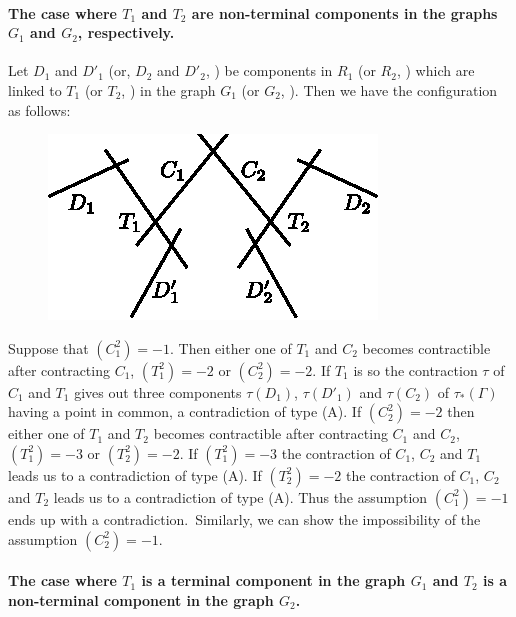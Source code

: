 \paragraph{The case where $T_{1}$ and $T_{2}$ are non-terminal
  components in the graphs $G_{1}$ and $G_{2}$, respectively.}\label{chap2:6.17.2.1}


Let $D_{1}$ and $D'_{1}$ (or, $D_{2}$ and $D'_{2}$, \resp) be
components in $R_{1}$ (or $R_{2}$, \resp) which are linked to $T_{1}$
(or $T_{2}$, \resp) in the graph $G_{1}$ (or $G_{2}$, \resp). Then we
have the configuration as follows:
\begin{figure}[H]
\centering
\includegraphics[scale=1.2]{figures/chap2-fig36.eps}
\end{figure}

Suppose that $(C^{2}_{1})=-1$. Then either one of $T_{1}$ and $C_{2}$
becomes contractible after contracting $C_{1}$, \iec $(T^{2}_{1})=-2$
or $(C^{2}_{2})=-2$. If $T_{1}$ is so the contraction $\tau$ of
$C_{1}$ and $T_{1}$ gives out three components $\tau(D_{1})$,
$\tau(D'_{1})$ and $\tau(C_{2})$ of $\tau_{\ast}(\Gamma)$ having a
point in common, a contradiction of type (A). If $(C^{2}_{2})=-2$ then
either one of $T_{1}$ and $T_{2}$ becomes contractible after
contracting $C_{1}$ and $C_{2}$, \iec $(T^{2}_{1})=-3$ or
$(T^{2}_{2})=-2$. If $(T^{2}_{1})=-3$ the contraction of $C_{1}$,
$C_{2}$ and $T_{1}$ leads us to a contradiction of type (A). If
$(T^{2}_{2})=-2$ the contraction of $C_{1}$, $C_{2}$ and $T_{2}$ leads
us to a contradiction of type (A). Thus the assumption
$(C^{2}_{1})=-1$ ends up with a contradiction.\pageoriginale\
Similarly, we can show the impossibility of the assumption
$(C^{2}_{2})=-1$. 

\paragraph{The case where $T_{1}$ is a terminal component in the graph
$G_{1}$ and $T_{2}$ is a non-terminal component in the graph $G_{2}$.}\label{chap2:6.17.2.2}

